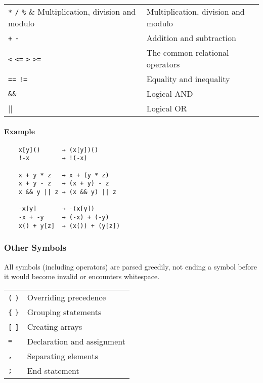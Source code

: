 \documentclass[12pt, a4paper]{article}
\begin{document}
\begin{table}[H]
    \begin{tabular}{ l l }
        \verb|*| \verb|/| \verb|%|            & Multiplication, division and modulo \\
        \verb|+| \verb|-|                     & Addition and subtraction            \\
        \verb|<| \verb|<=| \verb|>| \verb|>=| & The common relational operators     \\
        \verb|==| \verb|!=|                   & Equality and inequality             \\
        \verb|&&|                             & Logical AND                         \\
        \verb||||                             & Logical OR
    \end{tabular}
\end{table}

\paragraph{Example}

\begin{verbatim}
    x[y]()      → (x[y])()
    !-x         → !(-x)

    x + y * z   → x + (y * z)
    x + y - z   → (x + y) - z
    x && y || z → (x && y) || z

    -x[y]       → -(x[y])
    -x + -y     → (-x) + (-y)
    x() + y[z]  → (x()) + (y[z])
\end{verbatim}

\subsubsection{Other Symbols}

All symbols (including operators) are parsed greedily, not ending a symbol before it would become invalid or encounters whitespace.

\begin{table}[H]
    \begin{tabular}{ l l }
        \verb|(| \verb|)| & Overriding precedence      \\
        \verb|{| \verb|}| & Grouping statements        \\
        \verb|[| \verb|]| & Creating arrays            \\
        \verb|=|          & Declaration and assignment \\
        \verb|,|          & Separating elements        \\
        \verb|;|          & End statement
    \end{tabular}
\end{table}
\end{document}
